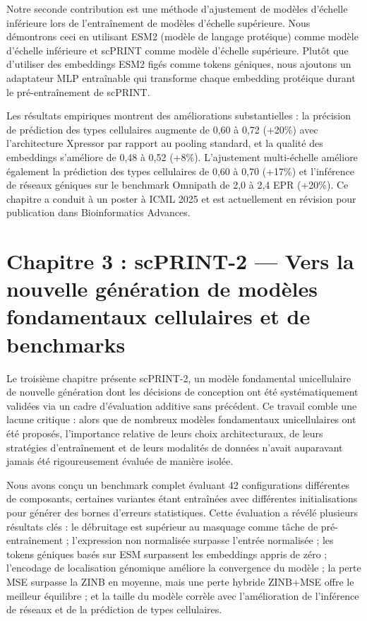 Notre seconde contribution est une méthode d'ajustement de modèles d'échelle inférieure lors de l'entraînement de modèles d'échelle supérieure. Nous démontrons ceci en utilisant ESM2 (modèle de langage protéique) comme modèle d'échelle inférieure et scPRINT comme modèle d'échelle supérieure. Plutôt que d'utiliser des embeddings ESM2 figés comme tokens géniques, nous ajoutons un adaptateur MLP entraînable qui transforme chaque embedding protéique durant le pré-entraînement de scPRINT.

Les résultats empiriques montrent des améliorations substantielles : la précision de prédiction des types cellulaires augmente de 0,60 à 0,72 (+20\%) avec l'architecture Xpressor par rapport au pooling standard, et la qualité des embeddings s'améliore de 0,48 à 0,52 (+8\%). L'ajustement multi-échelle améliore également la prédiction des types cellulaires de 0,60 à 0,70 (+17\%) et l'inférence de réseaux géniques sur le benchmark Omnipath de 2,0 à 2,4 EPR (+20\%). Ce chapitre a conduit à un poster à ICML 2025 et est actuellement en révision pour publication dans Bioinformatics Advances.

\section*{Chapitre 3 : scPRINT-2 — Vers la nouvelle génération de modèles fondamentaux cellulaires et de benchmarks}

Le troisième chapitre présente scPRINT-2, un modèle fondamental unicellulaire de nouvelle génération dont les décisions de conception ont été systématiquement validées via un cadre d'évaluation additive sans précédent. Ce travail comble une lacune critique : alors que de nombreux modèles fondamentaux unicellulaires ont été proposés, l'importance relative de leurs choix architecturaux, de leurs stratégies d'entraînement et de leurs modalités de données n'avait auparavant jamais été rigoureusement évaluée de manière isolée.

Nous avons conçu un benchmark complet évaluant 42 configurations différentes de composants, certaines variantes étant entraînées avec différentes initialisations pour générer des bornes d'erreurs statistiques. Cette évaluation a révélé plusieurs résultats clés : le débruitage est supérieur au masquage comme tâche de pré-entraînement ; l'expression non normalisée surpasse l'entrée normalisée ; les tokens géniques basés sur ESM surpassent les embeddings appris de zéro ; l'encodage de localisation génomique améliore la convergence du modèle ; la perte MSE surpasse la ZINB en moyenne, mais une perte hybride ZINB+MSE offre le meilleur équilibre ; et la taille du modèle corrèle avec l'amélioration de l'inférence de réseaux et de la prédiction de types cellulaires.

